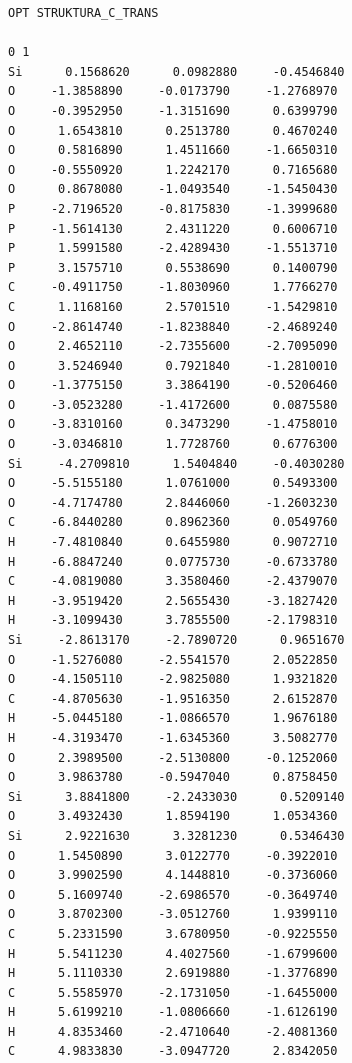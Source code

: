 \documentclass[
digital, %
table,   %
lof,     %
lot,     %
oneside,
]{fithesis3}
\begin{document}
\begin{lstlisting}[frame=single, caption={puvodni struktura C trans },label=DescriptiveLabel]
OPT STRUKTURA_C_TRANS

0 1
Si      0.1568620      0.0982880     -0.4546840
O     -1.3858890     -0.0173790     -1.2768970
O     -0.3952950     -1.3151690      0.6399790
O      1.6543810      0.2513780      0.4670240
O      0.5816890      1.4511660     -1.6650310
O     -0.5550920      1.2242170      0.7165680
O      0.8678080     -1.0493540     -1.5450430
P     -2.7196520     -0.8175830     -1.3999680
P     -1.5614130      2.4311220      0.6006710
P      1.5991580     -2.4289430     -1.5513710
P      3.1575710      0.5538690      0.1400790
C     -0.4911750     -1.8030960      1.7766270
C      1.1168160      2.5701510     -1.5429810
O     -2.8614740     -1.8238840     -2.4689240
O      2.4652110     -2.7355600     -2.7095090
O      3.5246940      0.7921840     -1.2810010
O     -1.3775150      3.3864190     -0.5206460
O     -3.0523280     -1.4172600      0.0875580
O     -3.8310160      0.3473290     -1.4758010
O     -3.0346810      1.7728760      0.6776300
Si     -4.2709810      1.5404840     -0.4030280
O     -5.5155180      1.0761000      0.5493300
O     -4.7174780      2.8446060     -1.2603230
C     -6.8440280      0.8962360      0.0549760
H     -7.4810840      0.6455980      0.9072710
H     -6.8847240      0.0775730     -0.6733780
C     -4.0819080      3.3580460     -2.4379070
H     -3.9519420      2.5655430     -3.1827420
H     -3.1099430      3.7855500     -2.1798310
Si     -2.8613170     -2.7890720      0.9651670
O     -1.5276080     -2.5541570      2.0522850
O     -4.1505110     -2.9825080      1.9321820
C     -4.8705630     -1.9516350      2.6152870
H     -5.0445180     -1.0866570      1.9676180
H     -4.3193470     -1.6345360      3.5082770
O      2.3989500     -2.5130800     -0.1252060
O      3.9863780     -0.5947040      0.8758450
Si      3.8841800     -2.2433030      0.5209140
O      3.4932430      1.8594190      1.0534360
Si      2.9221630      3.3281230      0.5346430
O      1.5450890      3.0122770     -0.3922010
O      3.9902590      4.1448810     -0.3736060
O      5.1609740     -2.6986570     -0.3649740
O      3.8702300     -3.0512760      1.9399110
C      5.2331590      3.6780950     -0.9225550
H      5.5411230      4.4027560     -1.6799600
H      5.1110330      2.6919880     -1.3776890
C      5.5585970     -2.1731050     -1.6455000
H      5.6199210     -1.0806660     -1.6126190
H      4.8353460     -2.4710640     -2.4081360
C      4.9833830     -3.0947720      2.8342050

\end{lstlisting}
\end{document}
